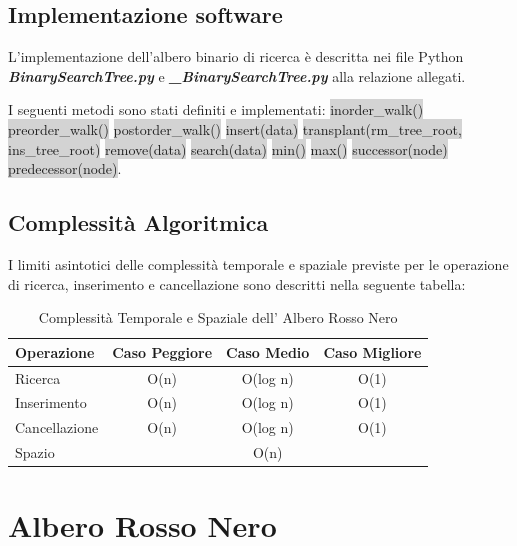 \documentclass{article}
\begin{document}
		\subsection{Implementazione software}
			L'implementazione dell'albero binario di ricerca è descritta nei file Python \textbf{\textit{BinarySearchTree.py}} e \textbf{\textit{\_BinarySearchTree.py}} alla relazione allegati.
			
			I seguenti metodi sono stati definiti e implementati:
			\newline
			\colorbox{lightgray}{inorder\_walk()} \colorbox{lightgray}{preorder\_walk()} \colorbox{lightgray}{postorder\_walk()} \colorbox{lightgray}{insert(data)} \colorbox{lightgray}{transplant(rm\_tree\_root, ins\_tree\_root)} \colorbox{lightgray}{remove(data)} \colorbox{lightgray}{search(data)} \colorbox{lightgray}{min()} \colorbox{lightgray}{max()} \colorbox{lightgray}{successor(node)} \colorbox{lightgray}{predecessor(node)}.
			
		\subsection{Complessità Algoritmica}
			I limiti asintotici delle complessità temporale e spaziale previste per le operazione di ricerca, inserimento e cancellazione sono descritti nella seguente tabella:
			
			\begin{table}[ht]
				\centering
				\begin{tabular}{|l|ccc|}
					\rowcolor[HTML]{C0C0C0}
					\hline
					Operazione    & Caso Peggiore & Caso Medio & Caso Migliore \\
					\hline
					Ricerca       & O(n)          & O(log n)    & O(1)          \\
					\hline
					Inserimento   & O(n)          & O(log n)    & O(1)          \\
					\hline
					Cancellazione & O(n)          & O(log n)    & O(1)		   \\
					\hline
					\noalign{\smallskip}
					\noalign{\smallskip}
					\hline
					Spazio		  &			 	  & O(n) 	   &			   \\
					\hline
				\end{tabular}
				\caption{Complessità Temporale e Spaziale dell' Albero Rosso Nero}
			\end{table}

	\newpage
	\section{Albero Rosso Nero}
\end{document}

